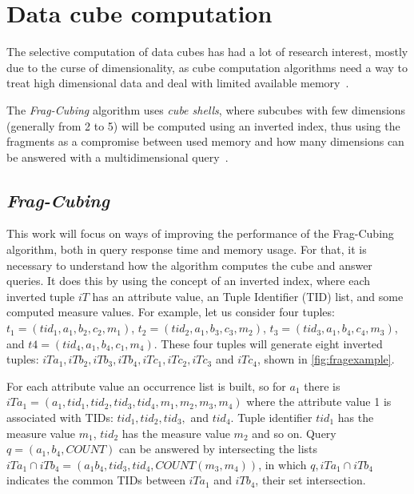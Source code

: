 \section{Data cube computation}\label{ch:corr:cube}

The selective computation of data cubes has had a lot of research interest, mostly due to the curse of dimensionality, as cube computation algorithms need a way to treat high dimensional data and deal with limited available memory~\cite{hanDataMiningConcepts2011}.

The \textit{Frag-Cubing} algorithm uses \textit{cube shells}, where subcubes with few dimensions (generally from 2 to 5) will be computed using an inverted index, thus using the fragments as a compromise between used memory and how many dimensions can be answered with a multidimensional query~\cite{liHighdimensionalOLAPMinimal2004}.

\subsection{\textit{Frag-Cubing}}\label{ch:corr:cube:frag}

This work will focus on ways of improving the performance of the Frag-Cubing algorithm, both in query response time and memory usage.
For that, it is necessary to understand how the algorithm computes the cube and answer queries.
It does this by using the concept of an inverted index, where each inverted tuple $iT$ has an attribute value, an Tuple Identifier (TID) list, and some computed measure values.
For example, let us consider four tuples: $t_1 = (tid_1, a_1, b_2, c_2, m_1)$, $t_2 = (tid_2, a_1, b_3, c_3, m_2)$, $t_3 = (tid_3, a_1, b_4, c_4, m_3)$, and $t4 = (tid_4, a_1, b_4, c_1, m_4)$.
These four tuples will generate eight inverted tuples: $iTa_1, iTb_2, iTb_3, iTb_4, iTc_1, iTc_2, iTc_3$ and $iTc_4$, shown in \autoref{fig:fragexample}.

For each attribute value an occurrence list is built, so for $a_1$ there is $iTa_1 = (a_1, tid_1, tid_2, tid_3, tid_4, m_1, m_2, m_3, m_4)$ where the attribute value 1 is associated with TIDs: $tid_1, tid_2, tid_3,$ and $tid_4$.
Tuple identifier $tid_1$ has the measure value $m_1$, $tid_2$ has the measure value $m_2$ and so on.
Query $q = (a_1, b_4, COUNT)$ can be answered by intersecting the lists $iTa_1 \cap iTb_4 = (a_1b_4, tid_3, tid_4, COUNT(m_3, m_4))$, in which $q, iTa_1 \cap iTb_4$ indicates the common TIDs between $iTa_1$ and $iTb_4$, their set intersection.

